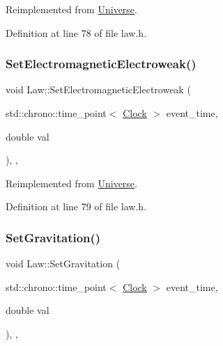 Reimplemented from \hyperlink{class_universe_aa981fc7e252b1fbbb675f0371860954d}{Universe}.



Definition at line 78 of file law.\+h.

\mbox{\label{class_law_aca9bb82839ddb46bd89f52b6211c5a54}} 
\subsubsection{\texorpdfstring{Set\+Electromagnetic\+Electroweak()}{SetElectromagneticElectroweak()}}
{\footnotesize\ttfamily void Law\+::\+Set\+Electromagnetic\+Electroweak (\begin{DoxyParamCaption}\item[{std\+::chrono\+::time\+\_\+point$<$ \hyperlink{universe_8h_a0ef8d951d1ca5ab3cfaf7ab4c7a6fd80}{Clock} $>$}]{event\+\_\+time,  }\item[{double}]{val }\end{DoxyParamCaption})\hspace{0.3cm}{\ttfamily [inline]}, {\ttfamily [final]}, {\ttfamily [virtual]}}



Reimplemented from \hyperlink{class_universe_a608aa95698380f791a0ffba45cc1bee3}{Universe}.



Definition at line 79 of file law.\+h.

\mbox{\label{class_law_a908ccc2b0a561a7324a15393ec157219}} 
\subsubsection{\texorpdfstring{Set\+Gravitation()}{SetGravitation()}}
{\footnotesize\ttfamily void Law\+::\+Set\+Gravitation (\begin{DoxyParamCaption}\item[{std\+::chrono\+::time\+\_\+point$<$ \hyperlink{universe_8h_a0ef8d951d1ca5ab3cfaf7ab4c7a6fd80}{Clock} $>$}]{event\+\_\+time,  }\item[{double}]{val }\end{DoxyParamCaption})\hspace{0.3cm}{\ttfamily [inline]}, {\ttfamily [final]}, {\ttfamily [virtual]}}



